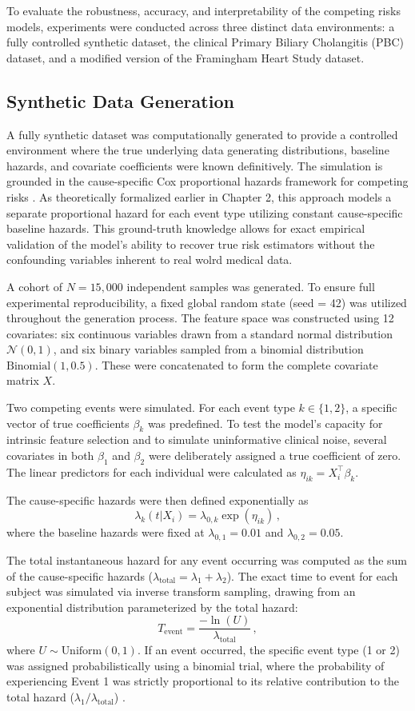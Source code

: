 \documentclass[a4paper,twoside,12pt]{report}
\begin{document}
To evaluate the robustness, accuracy, and interpretability of the competing risks models, experiments were conducted across three distinct data environments: a fully controlled synthetic dataset, the clinical Primary Biliary Cholangitis (PBC) dataset, and a modified version of the Framingham Heart Study dataset.

\subsection{Synthetic Data Generation}
A fully synthetic dataset was computationally generated to provide a controlled environment where the true underlying data generating distributions, baseline hazards, and covariate coefficients were known definitively. The simulation is grounded in the cause-specific Cox proportional hazards framework for competing risks \citep{Cox1972, prentice1978analysis}. As theoretically formalized earlier in Chapter 2, this approach models a separate proportional hazard for each event type utilizing constant cause-specific baseline hazards. This ground-truth knowledge allows for exact empirical validation of the model's ability to recover true risk estimators without the confounding variables inherent to real wolrd medical data.

A cohort of $N = 15,000$ independent samples was generated. To ensure full experimental reproducibility, a fixed global random state (seed = 42) was utilized throughout the generation process. The feature space was constructed using 12 covariates: six continuous variables drawn from a standard normal distribution $\mathcal{N}(0, 1)$, and six binary variables sampled from a binomial distribution $\text{Binomial}(1, 0.5)$. These were concatenated to form the complete covariate matrix $X$.

Two competing events were simulated. For each event type $k \in \{1, 2\}$, a specific vector of true coefficients $\beta_k$ was predefined. To test the model's capacity for intrinsic feature selection and to simulate uninformative clinical noise, several covariates in both $\beta_1$ and $\beta_2$ were deliberately assigned a true coefficient of zero. The linear predictors for each individual were calculated as $\eta_{ik} = X_i^\top \beta_k$.

The cause-specific hazards were then defined exponentially as
$$\lambda_k(t|X_i) = \lambda_{0,k} \exp(\eta_{ik}) \,,$$
where the baseline hazards were fixed at $\lambda_{0,1} = 0.01$ and $\lambda_{0,2} = 0.05$. 

The total instantaneous hazard for any event occurring was computed as the sum of the cause-specific hazards ($\lambda_{\text{total}} = \lambda_1 + \lambda_2$). The exact time to event for each subject was simulated via inverse transform sampling, drawing from an exponential distribution parameterized by the total hazard:
$$T_{\text{event}} = \frac{-\ln(U)}{\lambda_{\text{total}}} \,,$$
where $U \sim \text{Uniform}(0,1)$. If an event occurred, the specific event type (1 or 2) was assigned probabilistically using a binomial trial, where the probability of experiencing Event 1 was strictly proportional to its relative contribution to the total hazard ($\lambda_1 / \lambda_{\text{total}}$) \citep{beyersmann2009simulating}.
\end{document}
